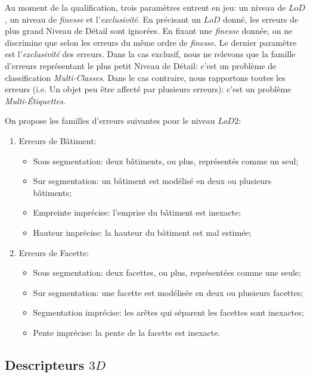 \documentclass[a4paper,french]{article}
\begin{document}
    Au moment de la qualification, trois paramètres entrent en jeu: un niveau de $LoD$, un niveau de \emph{finesse} et l'\emph{exclusivité}. En précisant un $LoD$ donné, les erreurs de plus grand Niveau de Détail sont ignorées. En fixant une \emph{finesse} donnée, on ne discrimine que selon les erreurs du même ordre de \emph{finesse}. Le dernier paramètre est l'\emph{exclusivité} des erreurs. Dans la cas exclusif, nous ne relevons que la famille d'erreurs représentant le plus petit Niveau de Détail: c'est un problème de classification \textit{Multi-Classes}. Dans le cas contraire, nous rapportons toutes les erreurs (i.e. Un objet peu être affecté par plusieurs erreurs): c'est un problème \textit{Multi-\'Etiquettes}.

    On propose les familles d'erreurs suivantes pour le niveau $LoD 2$:

    \begin{enumerate}[label= (\roman*)., itemsep=0pt]
        \item Erreurs de Bâtiment:
        \begin{itemize}[itemsep=0pt]
            \item Sous segmentation: deux bâtiments, ou plus, représentés comme un seul;
            \item Sur segmentation: un bâtiment est modélisé en deux ou plusieurs bâtiments;
            \item Empreinte imprécise: l'emprise du bâtiment est inexacte;
            \item Hauteur imprécise: la hauteur du bâtiment est mal estimée;
        \end{itemize}
        \item Erreurs de Facette:
        \begin{itemize}[itemsep=0pt]
            \item Sous segmentation: deux facettes, ou plus, représentées comme une seule;
            \item Sur segmentation: une facette est modélisée en deux ou plusieurs facettes;
            \item Segmentation imprécise: les arêtes qui séparent les facettes sont inexactes;
            \item Pente imprécise: la pente de la facette est inexacte.
        \end{itemize}
    \end{enumerate}

    \subsection{Descripteurs $3D$}
\end{document}
